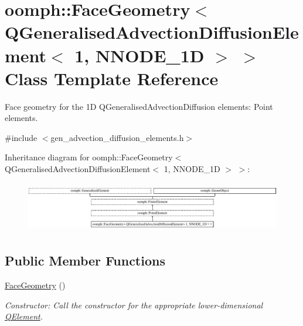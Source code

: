 \hypertarget{classoomph_1_1FaceGeometry_3_01QGeneralisedAdvectionDiffusionElement_3_011_00_01NNODE__1D_01_4_01_4}{}\section{oomph\+:\+:Face\+Geometry$<$ Q\+Generalised\+Advection\+Diffusion\+Element$<$ 1, N\+N\+O\+D\+E\+\_\+1D $>$ $>$ Class Template Reference}
\label{classoomph_1_1FaceGeometry_3_01QGeneralisedAdvectionDiffusionElement_3_011_00_01NNODE__1D_01_4_01_4}


Face geometry for the 1D Q\+Generalised\+Advection\+Diffusion elements\+: Point elements.  




{\ttfamily \#include $<$gen\+\_\+advection\+\_\+diffusion\+\_\+elements.\+h$>$}

Inheritance diagram for oomph\+:\+:Face\+Geometry$<$ Q\+Generalised\+Advection\+Diffusion\+Element$<$ 1, N\+N\+O\+D\+E\+\_\+1D $>$ $>$\+:\begin{figure}[H]
\begin{center}
\leavevmode
\includegraphics[height=2.209073cm]{classoomph_1_1FaceGeometry_3_01QGeneralisedAdvectionDiffusionElement_3_011_00_01NNODE__1D_01_4_01_4}
\end{center}
\end{figure}
\subsection*{Public Member Functions}
\begin{DoxyCompactItemize}
\item 
\hyperlink{classoomph_1_1FaceGeometry_3_01QGeneralisedAdvectionDiffusionElement_3_011_00_01NNODE__1D_01_4_01_4_afea1308a286ac676d6f8dd20329b7603}{Face\+Geometry} ()
\begin{DoxyCompactList}\small\item\em Constructor\+: Call the constructor for the appropriate lower-\/dimensional \hyperlink{classoomph_1_1QElement}{Q\+Element}. \end{DoxyCompactList}\end{DoxyCompactItemize}
